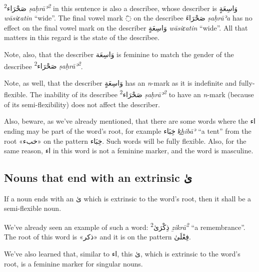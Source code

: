 \documentclass[
  10pt,
]{book}
\begin{document}
\foreignlanguage{arabic}{صَحْرَاء\textsuperscript{2}} \emph{ṣaḥrāʾ\textsuperscript{2}} in this sentence
is also a describee, whose describer is \foreignlanguage{arabic}{وَاسِعَةٍ} \emph{wāsiɛatin} \enquote{wide}. The final vowel mark \foreignlanguage{arabic}{◌َ} on the describee \foreignlanguage{arabic}{صَحْرَاءَ} \emph{ṣaḥrāʾa} has no effect on the final vowel mark on the describer \foreignlanguage{arabic}{وَاسِعَةٍ} \emph{wāsiɛatin} \enquote{wide}. All that matters in this regard is the state of the describee.

Note, also, that the describer \foreignlanguage{arabic}{وَاسِعَة} is feminine to match the gender of the describee
\foreignlanguage{arabic}{صَحْرَاء\textsuperscript{2}} \emph{ṣaḥrāʾ\textsuperscript{2}}.

Note, as well, that the describer \foreignlanguage{arabic}{وَاسِعَةٍ} has an \emph{n}-mark as it is indefinite and fully-flexible. The inability of its describee
\foreignlanguage{arabic}{صَحْرَاء\textsuperscript{2}} \emph{ṣaḥrāʾ\textsuperscript{2}}
to have an \emph{n}-mark (because of its semi-flexibility) does not affect the describer.

Also, beware, as we've already mentioned, that there are some words where the \foreignlanguage{arabic}{اء} ending may be part of the word's root, for example
\foreignlanguage{arabic}{خِبَاء} \emph{k͟hibāʾ} \enquote{a tent} from the root \foreignlanguage{arabic}{«خبء»} on the pattern \foreignlanguage{arabic}{خِبَاء}. Such words will be fully flexible.
Also, for the same reason, \foreignlanguage{arabic}{اء} in this word is not a feminine marker, and the word is masculine.

\subsection{\texorpdfstring{Nouns that end with an extrinsic \foreignlanguage{arabic}{ىٰ}}{Nouns that end with an extrinsic ىٰ}}\label{nouns-that-end-with-an-extrinsic-ux649}

If a noun ends with an \foreignlanguage{arabic}{ىٰ} which is extrinsic to the word's root, then it shall be a semi-flexible noun.

We've already seen an example of such a word: \foreignlanguage{arabic}{ذِکْرَىٰ\textsuperscript{2}} \emph{ẕikrā\textsuperscript{2}} \enquote{a remembrance}. The root of this word is \foreignlanguage{arabic}{«ذکر»} and it is on the pattern \foreignlanguage{arabic}{فِعْلَىٰ}.

We've also learned that, similar to \foreignlanguage{arabic}{اء}, this \foreignlanguage{arabic}{ىٰ}, which is extrinsic to the word's root, is a feminine marker for singular nouns.
\end{document}
